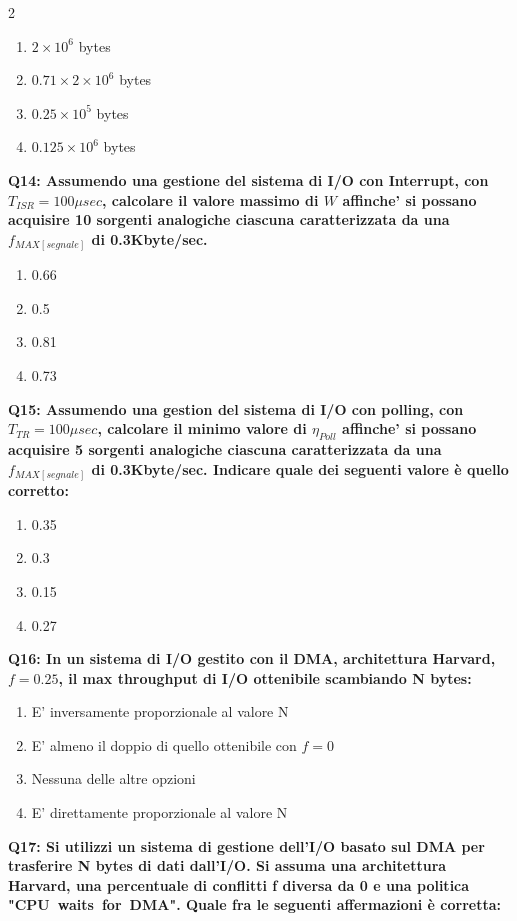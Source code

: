 \documentclass[10pt]{article}
\begin{document}
\begin{multicols}{2}
\begin{enumerate}[label=\arabic*.]
\item $2 \times 10^6$ bytes
\item $0.71 \times 2 \times 10^6$ bytes
\item $0.25 \times 10^5$ bytes
\item $0.125 \times 10^6$ bytes
\end{enumerate}
\textbf{Q14: Assumendo una gestione del sistema di I/O con Interrupt, con $T_{ISR}=100\mu sec$, calcolare il valore massimo di $W$ affinche' si possano acquisire 10 sorgenti analogiche ciascuna caratterizzata da una $f_{MAX[segnale]}$ di 0.3Kbyte/sec.}

\begin{enumerate}[label=\arabic*.]
\item 0.66
\item 0.5
\item 0.81
\item 0.73
\end{enumerate}
\textbf{Q15: Assumendo una gestion del sistema di I/O con polling, con $T_{TR}=100\mu sec$, calcolare il minimo valore di $\eta_{Poll}$ affinche' si possano acquisire 5 sorgenti analogiche ciascuna caratterizzata da una $f_{MAX[segnale]}$ di 0.3Kbyte/sec.  Indicare quale dei seguenti valore è quello corretto:}

\begin{enumerate}[label=\arabic*.]
\item 0.35
\item 0.3
\item 0.15
\item 0.27
\end{enumerate}
\textbf{Q16: In un sistema di I/O gestito con il DMA, architettura Harvard, $f=0.25$, il max throughput di I/O ottenibile scambiando N bytes:}

\begin{enumerate}[label=\arabic*.]
\item E' inversamente proporzionale al valore N
\item E' almeno il doppio di quello ottenibile con $f=0$
\item Nessuna delle altre opzioni
\item E' direttamente proporzionale al valore N
\end{enumerate}
\textbf{Q17: Si utilizzi un sistema di gestione dell’I/O basato sul DMA per trasferire N bytes di dati dall’I/O. Si assuma una architettura Harvard, una percentuale di conflitti f diversa da 0 e una politica "CPU waits for DMA". Quale fra le seguenti affermazioni è corretta:}


\end{multicols}
\end{document}
